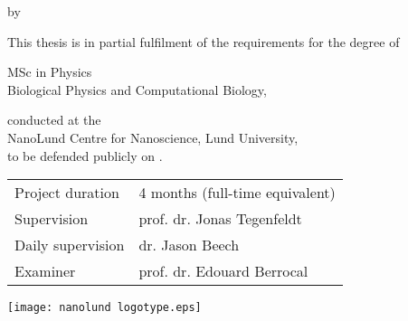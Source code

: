 {
\pagestyle{empty}



\clearpage

\begin{titlepage}
	
	\frutigerfont
	
	\begin{center}

		
		{\Huge \garamondfont \thetitle}
		
		\smallskip
		by
		\bigskip
		
		{\Large \garamondfont \theauthor}
		
		\bigskip
		\bigskip
		
		This thesis is in partial fulfilment of the requirements for the degree of 
		
		\bigskip
		
		{MSc in Physics} \\
		Biological Physics and Computational Biology,
		
		\bigskip
		
		conducted at the \\
		NanoLund Centre for Nanoscience, Lund University,\\
		to be defended publicly on .
		
		
		\vspace{5cm}
		
		\vfill
		\begin{tabular}{ll}
			Project duration & 4 months (full-time equivalent)\\
			Supervision & prof. dr. Jonas Tegenfeldt\\
			Daily supervision & dr. Jason Beech\\
			Examiner & prof. dr. Edouard Berrocal
		\end{tabular}
	
		\vspace{3cm}
		
		\texttt{[image: nanolund logotype.eps]}
	
	
	\end{center}
\end{titlepage}
}